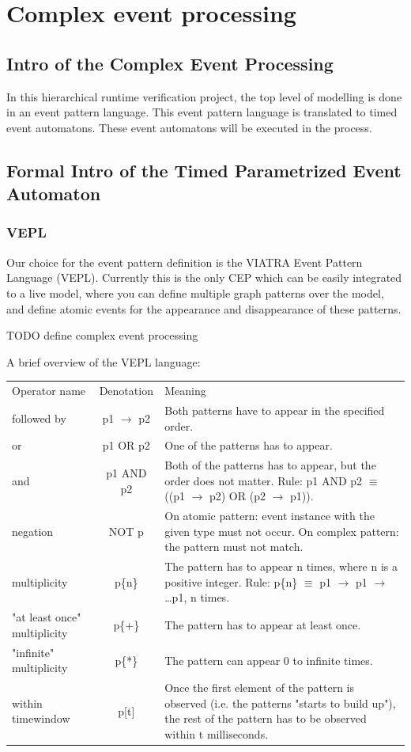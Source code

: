 \chapter{Complex event processing}
	\label{chap:cep}
	\section{Intro of the Complex Event Processing}
		In this hierarchical runtime verification project, the top level of modelling is done in an event pattern language.
		This event pattern language is translated to timed event automatons. These event automatons will be executed in the
		process.
	\section{Formal Intro of the Timed Parametrized Event Automaton}
		\subsection{VEPL}
			Our choice for the event pattern definition is the VIATRA Event Pattern Language (VEPL).
			Currently this is the only CEP which can be easily integrated to a live model, where 
			you can define multiple graph patterns over the model, and define atomic events for the
			appearance and disappearance of these patterns.
			
			
			TODO define complex event processing
			
			A brief overview of the VEPL language:

\begin{tabular}{lcm{6cm}}
\centering
Operator name &	Denotation & Meaning \\
followed by & p1 $\rightarrow$ p2 & Both patterns have to appear in the specified order. \\
or &	p1 OR p2 &	One of the patterns has to appear. \\
and &	p1 AND p2 &	Both of the patterns has to appear, but the order does not matter. Rule: p1 AND p2 $\equiv$ ((p1 $\rightarrow$ p2) OR (p2 $\rightarrow$ p1)). \\
negation &	NOT p &	On atomic pattern: event instance with the given type must not occur. On complex pattern: the pattern must not match. \\
multiplicity &	p\{n\} &	The pattern has to appear n times, where n is a positive integer. Rule: p\{n\} $\equiv$ p1 $\rightarrow$ p1 $\rightarrow$ \dots p1, n times. \\
"at least once" multiplicity &	p\{+\} &	The pattern has to appear at least once. \\
"infinite" multiplicity &	p\{*\} &	The pattern can appear 0 to infinite times. \\
within timewindow &	p[t] &	Once the first element of the pattern is observed (i.e. the patterns "starts to build up"), the rest of the pattern has to be observed within t milliseconds.
\end{tabular}	
			
